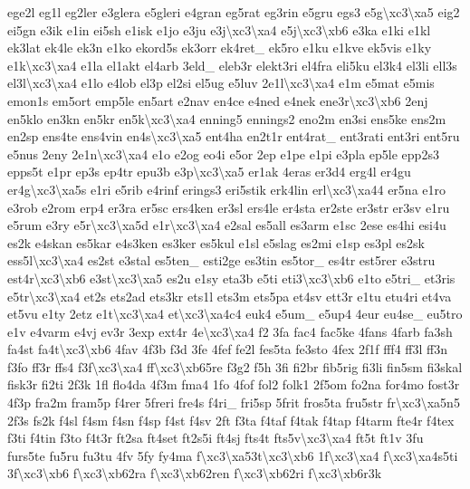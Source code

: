\begin{DoxyCompactItemize}
ege2l eg1l eg2ler e3glera e5gleri e4gran eg5rat eg3rin e5gru egs3 e5g\textbackslash{}xc3\textbackslash{}xa5 eig2 ei5gn e3ik e1in ei5sh e1isk e1jo e3ju e3j\textbackslash{}xc3\textbackslash{}xa4 e5j\textbackslash{}xc3\textbackslash{}xb6 e3ka e1ki e1kl ek3lat ek4le ek3n e1ko ekord5s ek3orr ek4ret\-\_\- ek5ro e1ku e1kve ek5vis e1ky e1k\textbackslash{}xc3\textbackslash{}xa4 e1la el1akt el4arb 3eld\-\_\- eleb3r elekt3ri el4fra eli5ku el3k4 el3li ell3s el3l\textbackslash{}xc3\textbackslash{}xa4 e1lo e4lob el3p el2si el5ug e5luv 2e1l\textbackslash{}xc3\textbackslash{}xa4 e1m e5mat e5mis emon1s em5ort emp5le en5art e2nav en4ce e4ned e4nek ene3r\textbackslash{}xc3\textbackslash{}xb6 2enj en5klo en3kn en5kr en5k\textbackslash{}xc3\textbackslash{}xa4 enning5 ennings2 eno2m en3si ens5ke ens2m en2sp ens4te ens4vin en4s\textbackslash{}xc3\textbackslash{}xa5 ent4ha en2t1r ent4rat\-\_\- ent3rati ent3ri ent5ru e5nus 2eny 2e1n\textbackslash{}xc3\textbackslash{}xa4 e1o e2og eo4i e5or 2ep e1pe e1pi e3pla ep5le epp2s3 epps5t e1pr ep3s ep4tr epu3b e3p\textbackslash{}xc3\textbackslash{}xa5 er1ak 4eras er3d4 erg4l er4gu er4g\textbackslash{}xc3\textbackslash{}xa5s e1ri e5rib e4rinf erings3 eri5stik erk4lin erl\textbackslash{}xc3\textbackslash{}xa44 er5na e1ro e3rob e2rom erp4 er3ra er5sc ers4ken er3sl ers4le er4sta er2ste er3str er3sv e1ru e5rum e3ry e5r\textbackslash{}xc3\textbackslash{}xa5d e1r\textbackslash{}xc3\textbackslash{}xa4 e2sal es5all es3arm e1sc 2ese es4hi esi4u es2k e4skan es5kar e4s3ken es3ker es5kul e1sl e5slag es2mi e1sp es3pl es2sk ess5l\textbackslash{}xc3\textbackslash{}xa4 es2st e3stal es5ten\-\_\- esti2ge es3tin es5tor\-\_\- es4tr est5rer e3stru est4r\textbackslash{}xc3\textbackslash{}xb6 e3st\textbackslash{}xc3\textbackslash{}xa5 es2u e1sy eta3b e5ti eti3\textbackslash{}xc3\textbackslash{}xb6 e1to e5tri\-\_\- et3ris e5tr\textbackslash{}xc3\textbackslash{}xa4 et2s ets2ad ets3kr ets1l ets3m ets5pa et4sv ett3r e1tu etu4ri et4va et5vu e1ty 2etz e1t\textbackslash{}xc3\textbackslash{}xa4 et\textbackslash{}xc3\textbackslash{}xa4c4 euk4 e5um\-\_\- e5up4 4eur eu4se\-\_\- eu5tro e1v e4varm e4vj ev3r 3exp ext4r 4e\textbackslash{}xc3\textbackslash{}xa4 f2 3fa fac4 fac5ke 4fans 4farb fa3sh fa4st fa4t\textbackslash{}xc3\textbackslash{}xb6 4fav 4f3b f3d 3fe 4fef fe2l fes5ta fe3sto 4fex 2f1f fff4 ff3l ff3n f3fo ff3r ffs4 f3f\textbackslash{}xc3\textbackslash{}xa4 ff\textbackslash{}xc3\textbackslash{}xb65re f3g2 f5h 3fi fi2br fib5rig fi3li fin5sm fi3skal fisk3r fi2ti 2f3k 1fl flo4da 4f3m fma4 1fo 4fof fol2 folk1 2f5om fo2na for4mo fost3r 4f3p fra2m fram5p f4rer 5freri fre4s f4ri\-\_\- fri5sp 5frit fros5ta fru5str fr\textbackslash{}xc3\textbackslash{}xa5n5 2f3s fs2k f4sl f4sm f4sn f4sp f4st f4sv 2ft f3ta f4taf f4tak f4tap f4tarm fte4r f4tex f3ti f4tin f3to f4t3r ft2sa ft4set ft2s5i ft4sj fts4t fts5v\textbackslash{}xc3\textbackslash{}xa4 ft5t ft1v 3fu furs5te fu5ru fu3tu 4fv 5fy fy4ma f\textbackslash{}xc3\textbackslash{}xa53t\textbackslash{}xc3\textbackslash{}xb6 1f\textbackslash{}xc3\textbackslash{}xa4 f\textbackslash{}xc3\textbackslash{}xa4s5ti 3f\textbackslash{}xc3\textbackslash{}xb6 f\textbackslash{}xc3\textbackslash{}xb62ra f\textbackslash{}xc3\textbackslash{}xb62ren f\textbackslash{}xc3\textbackslash{}xb62ri f\textbackslash{}xc3\textbackslash{}xb6r3k 
\end{DoxyCompactItemize}
